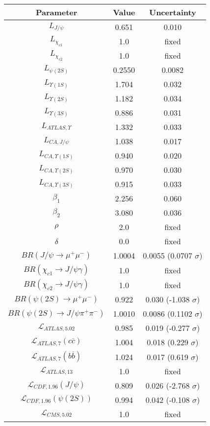 \begin{table}[h!]
\centering
\begin{tabular}{c|c|c}
Parameter & Value & Uncertainty \\
\hline
$L_{J/\psi}$ & 0.651 & 0.010 \\
$L_{\chi_{c1}}$ & 1.0 & fixed \\
$L_{\chi_{c2}}$ & 1.0 & fixed \\
$L_{\psi(2S)}$ & 0.2550 & 0.0082 \\
$L_{\Upsilon(1S)}$ & 1.704 & 0.032 \\
$L_{\Upsilon(2S)}$ & 1.182 & 0.034 \\
$L_{\Upsilon(3S)}$ & 0.886 & 0.031 \\
$L_{ATLAS,\Upsilon}$ & 1.332 & 0.033 \\
$L_{CA,J/\psi}$ & 1.038 & 0.017 \\
$L_{CA,\Upsilon(1S)}$ & 0.940 & 0.020 \\
$L_{CA,\Upsilon(2S)}$ & 0.970 & 0.030 \\
$L_{CA,\Upsilon(3S)}$ & 0.915 & 0.033 \\
$\beta_1$ & 2.256 & 0.060 \\
$\beta_2$ & 3.080 & 0.036 \\
$\rho$ & 2.0 & fixed \\
$\delta$ & 0.0 & fixed \\
$BR(J/\psi\rightarrow\mu^+\mu^-)$ & 1.0004 & 0.0055 (0.0707 $\sigma$) \\
$BR(\chi_{c1}\rightarrow J/\psi\gamma)$ & 1.0 & fixed \\
$BR(\chi_{c2}\rightarrow J/\psi\gamma)$ & 1.0 & fixed \\
$BR(\psi(2S)\rightarrow\mu^+\mu^-)$ & 0.922 & 0.030 (-1.038 $\sigma$) \\
$BR(\psi(2S)\rightarrow J/\psi\pi^+\pi^-)$ & 1.0010 & 0.0086 (0.1102 $\sigma$) \\
$\mathcal L_{ATLAS,5.02}$ & 0.985 & 0.019 (-0.277 $\sigma$) \\
$\mathcal L_{ATLAS,7}(c\overline c)$ & 1.004 & 0.018 (0.229 $\sigma$) \\
$\mathcal L_{ATLAS,7}(b\overline b)$ & 1.024 & 0.017 (0.619 $\sigma$) \\
$\mathcal L_{ATLAS,13}$ & 1.0 & fixed \\
$\mathcal L_{CDF,1.96}(J/\psi)$ & 0.809 & 0.026 (-2.768 $\sigma$) \\
$\mathcal L_{CDF,1.96}(\psi(2S))$ & 0.994 & 0.042 (-0.108 $\sigma$) \\
$\mathcal L_{CMS,5.02}$ & 1.0 & fixed \\

\end{tabular}
\end{table}
